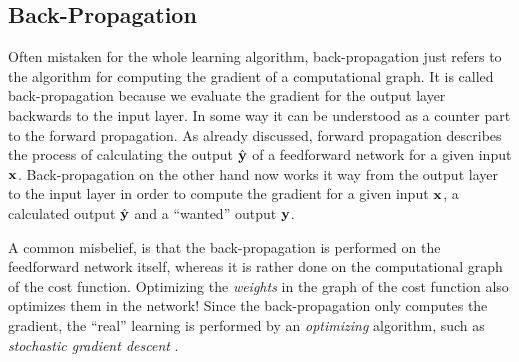 \subsection{Back-Propagation}
\label{sec:back-propagation}

Often mistaken for the whole learning algorithm, 
back-propagation just refers to the algorithm for computing the gradient of a computational graph.
It is called back-propagation because we evaluate the gradient for the output layer backwards to the input layer.
In some way it can be understood as a counter part to the forward propagation.
As already discussed, forward propagation describes the process of calculating the output \(\hat{\mathbf{y}}\) of a feedforward network for a given input \(\mathbf{x}\).
Back-propagation on the other hand now works it way from the output layer to the input layer in order to compute the gradient for a given input \(\mathbf{x}\), a calculated output \(\hat{\mathbf{y}}\) and
a \enquote{wanted} output \(\mathbf{y}\).

A common misbelief, is that the back-propagation is performed on the feedforward network itself, whereas it is rather done on the computational graph of the cost function.
Optimizing the \emph{weights} in the graph of the cost function also optimizes them in the network!
Since the back-propagation only computes the gradient, the \enquote{real} learning is performed by an \emph{optimizing} algorithm, such as \emph{stochastic gradient descent} .

